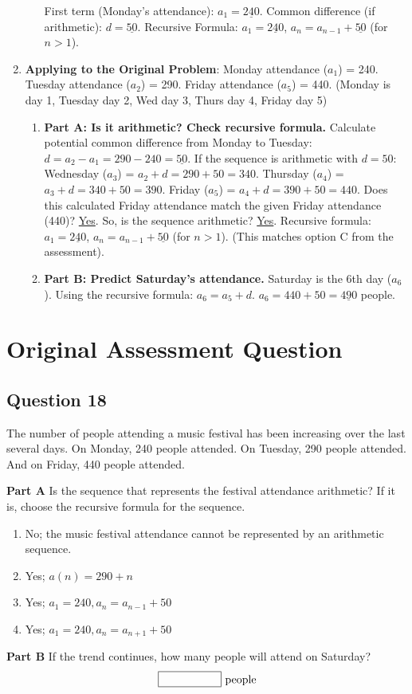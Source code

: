 \documentclass[12pt]{article}
\begin{document}
\begin{enumerate}[label=18.\arabic*]
\begin{enumerate}[label=\alph*)]
        First term (Monday's attendance): \( a_1 = \underline{240} \).
        Common difference (if arithmetic): \( d = \underline{50} \).
        Recursive Formula: \( a_1 = \underline{240} \), \( a_n = a_{n-1} + \underline{50} \) (for \(n > 1\)).
    \end{enumerate}
    \item \textbf{Applying to the Original Problem}:
    Monday attendance (\(a_1\)) = 240.
    Tuesday attendance (\(a_2\)) = 290.
    Friday attendance (\(a_5\)) = 440. (Monday is day 1, Tuesday day 2, Wed day 3, Thurs day 4, Friday day 5)
    \begin{enumerate}[label=\alph*)]
        \item \textbf{Part A: Is it arithmetic? Check recursive formula.}
        Calculate potential common difference from Monday to Tuesday: \( d = a_2 - a_1 = 290 - 240 = \underline{50} \).
        If the sequence is arithmetic with \(d=50\):
        Wednesday (\(a_3\)) = \(a_2 + d = 290 + 50 = 340 \).
        Thursday (\(a_4\)) = \(a_3 + d = 340 + 50 = 390 \).
        Friday (\(a_5\)) = \(a_4 + d = 390 + 50 = 440 \).
        Does this calculated Friday attendance match the given Friday attendance (440)? \underline{Yes}.
        So, is the sequence arithmetic? \underline{Yes}.
        Recursive formula: \( a_1 = \underline{240} \), \( a_n = a_{n-1} + \underline{50} \) (for \(n>1\)). (This matches option C from the assessment).
        \item \textbf{Part B: Predict Saturday's attendance.}
        Saturday is the 6th day (\(a_6\)).
        Using the recursive formula: \(a_6 = a_5 + d\).
        \(a_6 = 440 + 50 = \underline{490} \) people.
    \end{enumerate}
\end{enumerate}

\section*{Original Assessment Question}

\subsection*{Question 18}
The number of people attending a music festival has been increasing over the last several days. On Monday, 240 people attended. On Tuesday, 290 people attended. And on Friday, 440 people attended.

\textbf{Part A} Is the sequence that represents the festival attendance arithmetic? If it is, choose the recursive formula for the sequence.
\begin{enumerate}[label=\Alph*.]
    \item No; the music festival attendance cannot be represented by an arithmetic sequence.
    \item Yes; \( a(n) = 290 + n \)
    \item Yes; \( a_1 = 240, a_n = a_{n-1} + 50 \)
    \item Yes; \( a_1 = 240, a_n = a_{n+1} + 50 \)
\end{enumerate}

\textbf{Part B} If the trend continues, how many people will attend on Saturday?
\[ \framebox[2cm]{\phantom{Number}} \text{ people} \]

\end{document}
